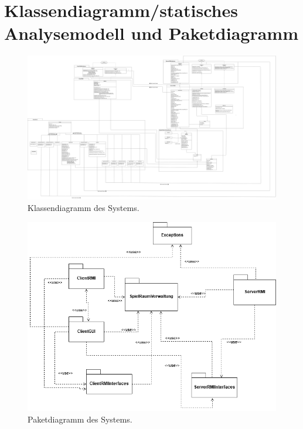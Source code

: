 \chapter{Klassendiagramm/statisches Analysemodell und Paketdiagramm}

\begin{figure}[ht]
	\centering
	\includegraphics[height=0.9\textwidth, angle=-90]{sonstige-diagramme/Klassendiagramm.png}
	\caption{Klassendiagramm des Systems.}
\end{figure}

\begin{figure}[ht]
	\centering
	\includegraphics[width=\textwidth]{sonstige-diagramme/Paketdiagramm.png}
	\caption{Paketdiagramm des Systems.}
\end{figure}

